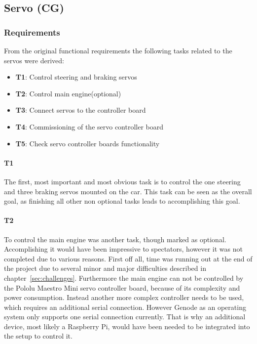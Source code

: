 \subsection{Servo (CG)}
\label{sec:servo}

\subsubsection{Requirements}
\label{sec:servo-require}
From the original functional requirements the following tasks related to the servos were derived:

\begin{itemize}
    \item \textbf{T1}: Control steering and braking servos
    \item \textbf{T2}: Control main engine(optional)
    \item \textbf{T3}: Connect servos to the controller board
    \item \textbf{T4}: Commissioning of the servo controller board
    \item \textbf{T5}: Check servo controller boards functionality
\end{itemize}

\paragraph{\textbf{T1}}
The first, most important and most obvious task is to control the one steering and three braking servos mounted on the car. This task can be seen as the overall goal, as finishing all other non optional tasks leads to accomplishing this goal.

\paragraph{\textbf{T2}}
To control the main engine was another task, though marked as optional. Accomplishing it would have been impressive to spectators, however it was not completed due to various reasons. First off all, time was running out at the end of the project due to several minor and major difficulties described in chapter~\ref{sec:challenges}. Furthermore the main engine can not be controlled by the Pololu Maestro Mini servo controller board, because of its complexity and power consumption. Instead another more complex controller needs to be used, which requires an additional serial connection. However Genode as an operating system only supports one serial connection currently. That is why an additional device, most likely a Raspberry Pi, would have been needed to be integrated into the setup to control it.

